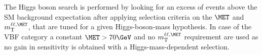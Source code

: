 The Higgs boson search is performed by
looking for an excess of events above the SM background
expectation after applying selection criteria on
the $\MET$ and $m_\mathrm{T}^{\ell\ell,\MET}$, that are tuned for a
given Higgs-boson-mass hypothesis. 
In case of the VBF category 
a constant $\MET>70\GeV$ and no $m_\mathrm{T}^{\ell\ell,\MET}$ 
requirement are used as no gain in sensitivity is obtained with a 
Higgs-mass-dependent selection.



